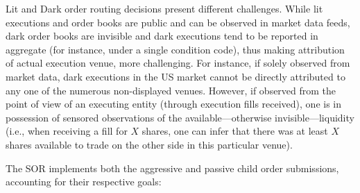 Lit and Dark order routing decisions present different challenges. While lit executions and order books are public and can be observed in market data feeds, dark order books are invisible and dark executions tend to be reported in aggregate (for instance, under a single condition code), thus making attribution of actual execution venue, more challenging. For instance, if solely observed from market data, dark executions in the US market cannot be directly attributed to any one of the numerous non-displayed venues. However, if observed from the point of view of an executing entity (through execution fills received), one is in possession of sensored observations of the available---otherwise invisible---liquidity (i.e., when receiving a fill for $X$ shares, one can infer that there was at least $X$ shares available to trade on the other side in this particular venue). 


The SOR implements both the aggressive and passive child order submissions, accounting for their respective goals:

